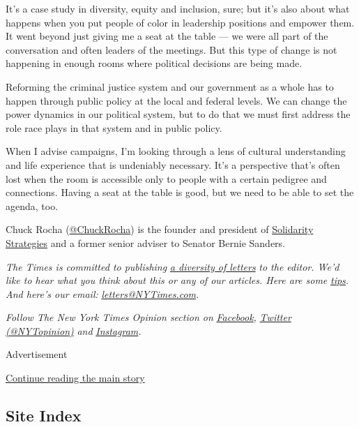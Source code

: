 It's a case study in diversity, equity and inclusion, sure; but it's
also about what happens when you put people of color in leadership
positions and empower them. It went beyond just giving me a seat at the
table --- we were all part of the conversation and often leaders of the
meetings. But this type of change is not happening in enough rooms where
political decisions are being made.

Reforming the criminal justice system and our government as a whole has
to happen through public policy at the local and federal levels. We can
change the power dynamics in our political system, but to do that we
must first address the role race plays in that system and in public
policy.

When I advise campaigns, I'm looking through a lens of cultural
understanding and life experience that is undeniably necessary. It's a
perspective that's often lost when the room is accessible only to people
with a certain pedigree and connections. Having a seat at the table is
good, but we need to be able to set the agenda, too.

Chuck Rocha
(\href{https://twitter.com/ChuckRocha?ref_src=twsrc\%5Egoogle\%7Ctwcamp\%5Eserp\%7Ctwgr\%5Eauthor}{@ChuckRocha})
is the founder and president of
\href{https://www.solidaritystrategies.com/}{Solidarity Strategies} and
a former senior adviser to Senator Bernie Sanders.

\emph{The Times is committed to publishing}
\href{https://www.nytimes3xbfgragh.onion/2019/01/31/opinion/letters/letters-to-editor-new-york-times-women.html}{\emph{a
diversity of letters}} \emph{to the editor. We'd like to hear what you
think about this or any of our articles. Here are some}
\href{https://help.nytimes3xbfgragh.onion/hc/en-us/articles/115014925288-How-to-submit-a-letter-to-the-editor}{\emph{tips}}\emph{.
And here's our email:}
\href{mailto:letters@NYTimes.com}{\emph{letters@NYTimes.com}}\emph{.}

\emph{Follow The New York Times Opinion section on}
\href{https://www.facebookcorewwwi.onion/nytopinion}{\emph{Facebook}}\emph{,}
\href{http://twitter.com/NYTOpinion}{\emph{Twitter (@NYTopinion)}}
\emph{and}
\href{https://www.instagram.com/nytopinion/}{\emph{Instagram}}\emph{.}

Advertisement

\protect\hyperlink{after-bottom}{Continue reading the main story}

\hypertarget{site-index}{%
\subsection{Site Index}\label{site-index}}

